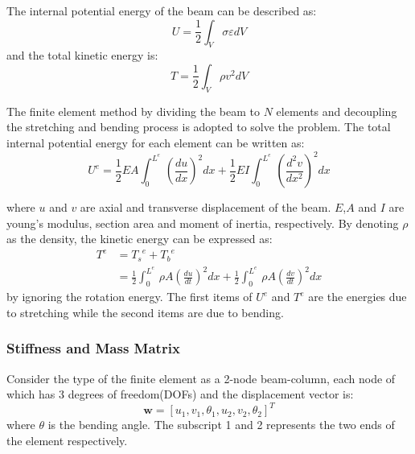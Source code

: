 \documentclass[conference, onecolumn]{IEEEtran}
\begin{document}
The internal potential energy of the beam can be described as:
\begin{equation}
    {U} = \frac{1}{2}\int_V \sigma\varepsilon  dV
	\label{potentialenergy}
\end{equation}
and the total kinetic energy is:
\begin{equation}
    {T} = \frac{1}{2}\int_V \rho v^2  dV
	\label{kineticenergy}
\end{equation}

 The finite element method by dividing the beam to $N$ elements and decoupling the stretching and bending process is adopted to solve the problem. The total internal potential energy for each element can be written as:
\begin{equation}
    {U^e} = \frac{1}{2}EA\int_{0}^{L^e}  \,\left(\frac{du}{dx}\right)^2dx + \frac{1}{2}EI\int_{0}^{L^e}  \,\left(\frac{d^2v}{dx^2}\right)^2dx
	\label{elementpotentialenergy}
\end{equation}

where $u$ and $v$ are axial and transverse displacement of the beam. $E$,$A$ and $I$ are young's modulus, section area and moment of inertia, respectively.
By denoting $\rho$ as the density, the kinetic energy can be expressed as:
\begin{equation}
	\begin{split}
    {T^e} & = {T_s}^e + {T_b}^e \\%
	& = \frac{1}{2}\int_{0}^{L^e}  \,\rho A\left(\frac{du}{dt}\right)^2dx + \frac{1}{2}\int_{0}^{L^e}  \,\rho A\left(\frac{dv}{dt}\right)^2dx
	\end{split}
	\label{elementkineticenergy}
\end{equation}
by ignoring the rotation energy. The first items of $U^e$ and $T^e$ are the energies due to stretching while the second items are due to bending.



\subsubsection{Stiffness and Mass Matrix}


Consider the type of the finite element as a 2-node beam-column, each node of which has 3 degrees of freedom(DOFs) and the displacement vector is:
\begin{equation}
    {\boldsymbol{w}} = 
		[u_1,v_1,\theta_1,u_2,v_2,\theta_2]^T
	\label{quality}
\end{equation}
where $\theta$ is the bending angle. The subscript 1 and 2 represents the two ends of the element respectively.
\end{document}
